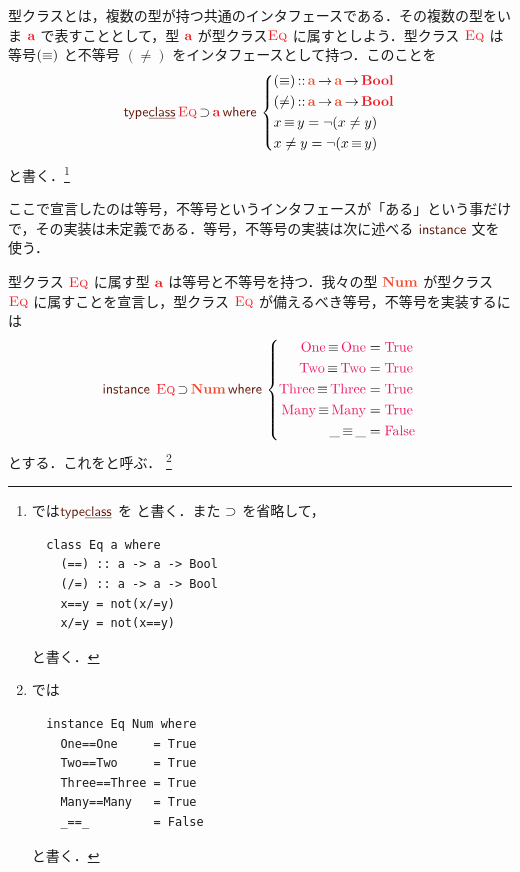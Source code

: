 \documentclass[a5paper,twoside,fleqn,draft]{jsbook}
\begin{document}
型クラスとは，複数の型が持つ共通のインタフェースである．その複数の型をいま $\hTypeName{a}$ で表すこととして，型 $\hTypeName{a}$ が型クラス$\hEq$ に属すとしよう．型クラス $\hEq$ は等号$(\operatorname{\equiv})$ と不等号 $(\neq)$ をインタフェースとして持つ．このことを
\begin{equation}
  \mTypeClassDecl\mathop{\hEq}\hHasElementsOf\hTypeName{a}\mWhere{}
  \left\{
  \begin{aligned}
    &(\hIfEq)\hIsTypeOf\mProjEXP{\mA }{\mProjEXP{\mA }{\hBool}}\\
    &(\neq)\hIsTypeOf\mProjEXP{\mA }{\mProjEXP{\mA }{\hBool}}\\
    &x\hIfEq y=\neg(x\neq y)\\
    &x\neq y=\neg(x\hIfEq y)
  \end{aligned}
  \right.
\end{equation}
と書く．\footnote{\haskell では$\mTypeClassDecl$ を  と書く．また $\operatorname{\supset}$ を省略して，
\begin{verbatim}
  class Eq a where
    (==) :: a -> a -> Bool
    (/=) :: a -> a -> Bool
    x==y = not(x/=y)
    x/=y = not(x==y)
\end{verbatim}
と書く．}


ここで宣言したのは等号，不等号というインタフェースが「ある」という事だけで，その実装は未定義である．等号，不等号の実装は次に述べる $\mInstanceDecl$ 文を使う．

型クラス $\hEq$ に属す型 $\hTypeName{a}$ は等号と不等号を持つ．我々の型 $\mType{Num}$ が型クラス $\hEq$ に属すことを宣言し，型クラス $\hEq$ が備えるべき等号，不等号を実装するには
\begin{equation}
  \mInstanceDecl\;\hEq\hHasElementsOf\mType{Num}
  \mWhere{}
  \left\{
  \begin{aligned}
    \mNumOne\hIfEq\mNumOne&=\hTrue\\
    \mNumTwo\hIfEq\mNumTwo&=\hTrue\\
    \mNumThree\hIfEq\mNumThree&=\hTrue\\
    \mNumMany\hIfEq\mNumMany&=\hTrue\\
    \_\hIfEq\_&=\hFalse
  \end{aligned}
  \right.
\end{equation}
とする．これをと呼ぶ．
\footnote{\haskell では
\begin{verbatim}
  instance Eq Num where
    One==One     = True
    Two==Two     = True
    Three==Three = True
    Many==Many   = True
    _==_         = False
\end{verbatim}
と書く．}
\end{document}
